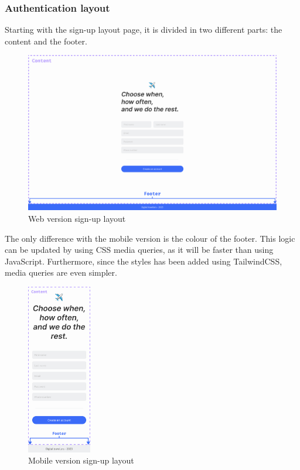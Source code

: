 \documentclass[./memory.tex]{subfiles}
\begin{document}
\subsubsection{Authentication layout}
Starting with the sign-up layout page, it is divided in two different parts: the
content and the footer.
\begin{figure}[H]
	\centering
	\includegraphics[width=\textwidth]{./assets/designs/sign-up-layout-web.png}
	\caption{Web version sign-up layout}
\end{figure}
The only difference with the mobile version is the colour of the footer. This
logic can be updated by using CSS media queries, as it will be faster than using
JavaScript. Furthermore, since the styles has been added using TailwindCSS,
media queries are even simpler.
\begin{figure}[H]
	\centering
	\includegraphics[width=0.25\textwidth]{./assets/designs/sign-up-layout-sm.png}
	\caption{Mobile version sign-up layout}
\end{figure}
\end{document}
